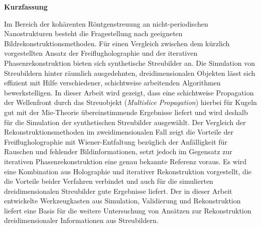 	\begin{Huge}
		\textbf{Kurzfassung}\vspace{12mm}
	\end{Huge}
	
	Im Bereich der kohärenten Röntgenstreuung an nicht-periodischen Nanostrukturen besteht die Fragestellung nach geeigneten Bildrekonstruktionsmethoden. Für einen Vergleich zwischen dem kürzlich vorgestellten Ansatz der Freiflugholographie und der iterativen Phasenrekonstruktion bieten sich synthetische Streubilder an. Die Simulation von Streubildern hinter räumlich ausgedehnten, dreidimensionalen Objekten lässt sich effizient mit Hilfe verschiedener, schichtweise arbeitenden Algorithmen bewerkstelligen. In dieser Arbeit wird gezeigt, dass eine schichtweise Propagation der Wellenfront durch das Streuobjekt (\textit{Multislice Propagation}) hierbei für Kugeln gut mit der Mie-Theorie übereinstimmende Ergebnisse liefert und wird deshalb für die Simulation der synthetischen Streubilder ausgewählt. Der Vergleich der Rekonstruktionsmethoden im zweidimensionalen Fall zeigt die Vorteile der Freiflugholographie mit Wiener-Entfaltung bezüglich der Anfälligkeit für Rauschen und fehlender Bildinformationen, setzt jedoch im Gegensatz zur iterativen Phasenrekonstruktion eine genau bekannte Referenz voraus. Es wird eine Kombination aus Holographie und iterativer Rekonstruktion vorgestellt, die die Vorteile beider Verfahren verbindet und auch für die simulierten dreidimensionalen Streubilder gute Ergebnisse liefert. Der in dieser Arbeit entwickelte Werkzeugkasten aus Simulation, Validierung und Rekonstruktion liefert eine Basis für die weitere Untersuchung von Ansätzen zur Rekonstruktion dreidimensionaler Informationen aus Streubildern.
